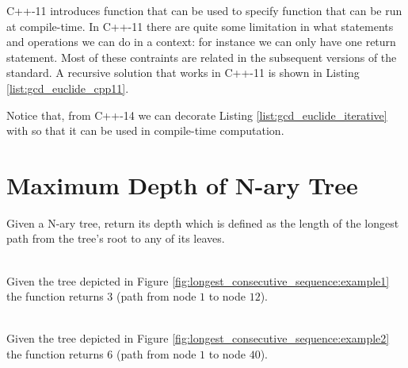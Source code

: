 C++-11 introduces  function that can be used to specify function that can be run at compile-time. In C++-11 there are quite some limitation in what statements and operations we can do in a  context: for instance we can only have one return statement. Most of these contraints are related in the subsequent versions of the standard. A  recursive solution that works in C++-11 is shown in Listing \ref{list:gcd_euclide_cpp11}.



Notice that, from C++-14 we can decorate Listing \ref{list:gcd_euclide_iterative} with  so that it can be used in compile-time computation.




\section{Maximum Depth of N-ary Tree}
\begin{exercise}
   Given a N-ary tree, return its depth which is defined as the length of the longest path from the tree's root to any of its leaves.
    \begin{example}
        \label{ex:nary-treedepth:example1}
        \hfill \\
        Given the tree depicted in Figure \ref{fig:longest_consecutive_sequence:example1} the function returns $3$ (path from node $1$ to node $12$).
    \end{example}
    
    \begin{example}
        \label{ex:nary-treedepth:example2}
        \hfill \\
        Given the tree depicted in Figure \ref{fig:longest_consecutive_sequence:example2} the function returns $6$ (path from node $1$ to node $40$).
    \end{example}
    \end{exercise}
 
